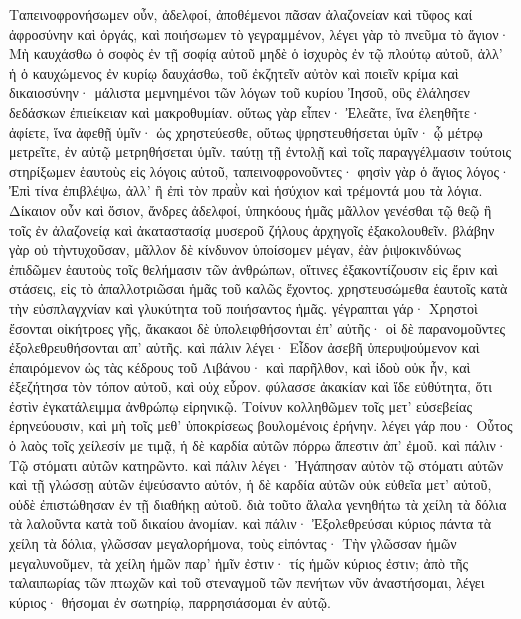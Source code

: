 Ταπεινοφρονήσωμεν οὖν, ἀδελφοί, ἀποθέμενοι πᾶσαν ἀλαζονείαν καὶ τῦφος καί ἀφροσύνην καὶ ὀργάς, καὶ ποιήσωμεν τὸ γεγραμμένον, λέγει γὰρ τὸ πνεῦμα τὸ ἅγιον· Μὴ καυχάσθω ὁ σοφὸς ἐν τῇ σοφίᾳ αὐτοῦ μηδὲ ὁ ἰσχυρὸς ἐν τῷ πλούτῳ αὐτοῦ, ἀλλ’ ἡ ὁ καυχώμενος ἐν κυρίῳ δαυχάσθω, τοῦ ἐκζητεῖν αὐτὸν καὶ ποιεῖν κρίμα καὶ δικαιοσύνην· μάλιστα μεμνημένοι τῶν λόγων τοῦ κυρίου Ἰησοῦ, οὓς ἐλάλησεν δεδάσκων ἐπιείκειαν καὶ μακροθυμίαν. οὕτως γὰρ εἶπεν· Ἐλεᾶτε, ἵνα ἐλεηθῆτε· ἀφίετε, ἵνα ἀφεθῇ ὑμῖν· ὡς χρηστεύεσθε, οὕτως ψρηστευθήσεται ὑμῖν· ᾧ μέτρῳ μετρεῖτε, ἐν αὐτῷ μετρηθήσεται ὑμῖν. ταύτῃ τῇ ἐντολῇ καὶ τοῖς παραγγέλμασιν τούτοις στηρίξωμεν ἑαυτοὺς εἰς λόγοις αὐτοῦ, ταπεινοφρονοῦντες· φησὶν γὰρ ὁ ἅγιος λόγος· Ἐπὶ τίνα ἐπιβλέψω, ἀλλ’ ἢ ἐπὶ τὸν πραῢν καὶ ἡσύχιον καὶ τρέμοντά μου τὰ λόγια.
Δίκαιον οὖν καὶ ὅσιον, ἄνδρες ἀδελφοί, ὑπηκόους ἡμᾶς μᾶλλον γενέσθαι τῷ θεῷ ἢ τοῖς ἐν ἀλαζονείᾳ καὶ ἀκαταστασίᾳ μυσεροῦ ζήλους ἀρχηγοῖς ἐξακολουθεῖν. βλάβην γὰρ οὐ τὴντυχοῦσαν, μᾶλλον δὲ κίνδυνον ὑποίσομεν μέγαν, ἐὰν ῥιψοκινδύνως ἐπιδῶμεν ἑαυτοὺς τοῖς θελήμασιν τῶν ἀνθρώπων, οἵτινες ἐξακοντίζουσιν εἰς ἔριν καὶ στάσεις, εἰς τὸ ἀπαλλοτριῶσαι ἡμᾶς τοῦ καλῶς ἔχοντος. χρηστευσώμεθα ἑαυτοῖς κατὰ τὴν εὐσπλαγχνίαν καὶ γλυκύτητα τοῦ ποιήσαντος ἡμᾶς. γέγραπται γάρ· Χρηστοὶ ἔσονται οἰκήτροες γῆς, ἄκακαοι δὲ ὑπολειφθήσονται ἐπ’ αὐτῆς· οἱ δὲ παρανομοῦντες ἐξολεθρευθήσονται απ’ αὐτῆς. καὶ πάλιν λέγει· Εἶδον ἀσεβῆ ὑπερυψούμενον καὶ ἐπαιρόμενον ὡς τὰς κέδρους τοῦ Λιβάνου· καὶ παρῆλθον, καὶ ἰδοὺ οὐκ ἦν, καὶ ἐξεζήτησα τὸν τόπον αὐτοῦ, καὶ οὐχ εὗρον. φύλασσε ἀκακίαν καὶ ἴδε εὐθύτητα, ὅτι ἐστὶν ἐγκατάλειμμα ἀνθρώπῳ εἰρηνικῷ.
Τοίνυν κολληθῶμεν τοῖς μετ’ εὐσεβείας ἐρηνεύουσιν, καὶ μὴ τοῖς μεθ’ ὑποκρίσεως βουλομένοις ἐρήνην. λέγει γάρ που· Οὗτος ὁ λαὸς τοῖς χείλεσίν με τιμᾷ, ἡ δὲ καρδία αὐτῶν πόρρω ἄπεστιν ἀπ’ ἐμοῦ. καὶ πάλιν· Τῷ στόματι αὐτῶν κατηρῶντο. καὶ πάλιν λέγει· Ἠγάπησαν αὐτὸν τῷ στόματι αὐτῶν καὶ τῇ γλώσσῃ αὐτῶν ἐψεύσαντο αὐτόν, ἡ δὲ καρδία αὐτῶν οὐκ εὐθεῖα μετ’ αὐτοῦ, οὐδὲ ἐπιστώθησαν ἐν τῇ διαθήκῃ αὐτοῦ. διὰ τοῦτο ἄλαλα γενηθήτω τὰ χείλη τὰ δόλια τὰ λαλοῦντα κατὰ τοῦ δικαίου ἀνομίαν. καὶ πάλιν· Ἐξολεθρεύσαι κύριος πάντα τὰ χείλη τὰ δόλια, γλῶσσαν μεγαλορήμονα, τοὺς εἰπόντας· Τὴν γλῶσσαν ἡμῶν μεγαλυνοῦμεν, τὰ χείλη ἡμῶν παρ’ ἡμῖν ἐστιν· τίς ἡμῶν κύριος ἐστιν; ἀπὸ τῆς ταλαιπωρίας τῶν πτωχῶν καὶ τοῦ στεναγμοῦ τῶν πενήτων νῦν ἀναστήσομαι, λέγει κύριος· θήσομαι ἐν σωτηρίῳ, παρρησιάσομαι ἐν αὐτῷ. 
